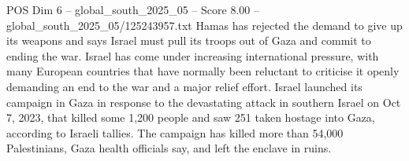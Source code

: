 \begin{textsample}{POS Dim 6 – global\_south\_2025\_05 – Score 8.00 – global\_south\_2025\_05/125243957.txt}
Hamas has rejected the demand to give up its weapons and says Israel must pull its troops out of Gaza and commit to ending the war.
Israel has come under increasing international pressure, with many European countries that have normally been reluctant to criticise it openly demanding an end to the war and a major relief effort.
Israel launched its campaign in Gaza in response to the devastating attack in southern Israel on Oct 7, 2023, that killed some 1,200 people and saw 251 taken hostage into Gaza, according to Israeli tallies.
The campaign has killed more than 54,000 Palestinians, Gaza health officials say, and left the enclave in ruins.

\end{textsample}

